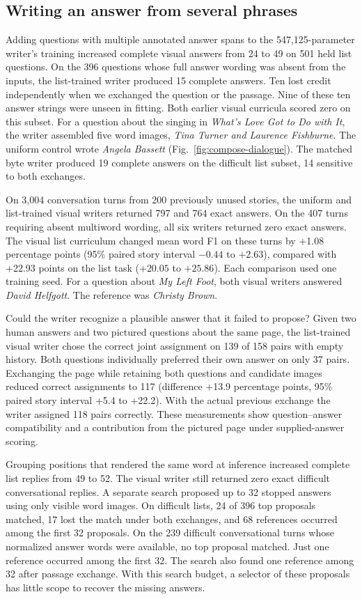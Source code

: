 \documentclass[12pt,a4paper]{article}
\providecommand{\DIFadd}[1]{{\protect\color{blue} \sf #1}} %
\begin{document}
\subsection*{\DIFadd{Writing an answer from several phrases}}
\DIFadd{Adding questions with multiple annotated answer spans to the 547,125-parameter writer's training increased complete visual answers from 24 to 49 on 501 held list questions. On the 396 questions whose full answer wording was absent from the inputs, the list-trained writer produced 15 complete answers. Ten lost credit independently when we exchanged the question or the passage. Nine of these ten answer strings were unseen in fitting. Both earlier visual curricula scored zero on this subset. For a question about the singing in \emph{What's Love Got to Do with It}, the writer assembled five word images, \emph{Tina Turner and Laurence Fishburne}. The uniform control wrote \emph{Angela Bassett} (Fig.~\ref{fig:compose-dialogue}). The matched byte writer produced 19 complete answers on the difficult list subset, 14 sensitive to both exchanges.
}

\DIFadd{On 3,004 conversation turns from 200 previously unused stories, the uniform and list-trained visual writers returned 797 and 764 exact answers. On the 407 turns requiring absent multiword wording, all six writers returned zero exact answers. The visual list curriculum changed mean word F1 on these turns by +1.08 percentage points (95\% paired story interval $-0.44$ to $+2.63$), compared with +22.93 points on the list task ($+20.05$ to $+25.86$). Each comparison used one training seed. For a question about \emph{My Left Foot}, both visual writers answered \emph{David Helfgott}. The reference was \emph{Christy Brown}.
}

\DIFadd{Could the writer recognize a plausible answer that it failed to propose? Given two human answers and two pictured questions about the same page, the list-trained visual writer chose the correct joint assignment on 139 of 158 pairs with empty history. Both questions individually preferred their own answer on only 37 pairs. Exchanging the page while retaining both questions and candidate images reduced correct assignments to 117 (difference +13.9 percentage points, 95\% paired story interval +5.4 to +22.2). With the actual previous exchange the writer assigned 118 pairs correctly. These measurements show question--answer compatibility and a contribution from the pictured page under supplied-answer scoring.
}

\DIFadd{Grouping positions that rendered the same word at inference increased complete list replies from 49 to 52. The visual writer still returned zero exact difficult conversational replies. A separate search proposed up to 32 stopped answers using only visible word images. On difficult lists, 24 of 396 top proposals matched, 17 lost the match under both exchanges, and 68 references occurred among the first 32 proposals. On the 239 difficult conversational turns whose normalized answer words were available, no top proposal matched. Just one reference occurred among the first 32. The search also found one reference among 32 after passage exchange. With this search budget, a selector of these proposals has little scope to recover the missing answers.
}
\end{document}

